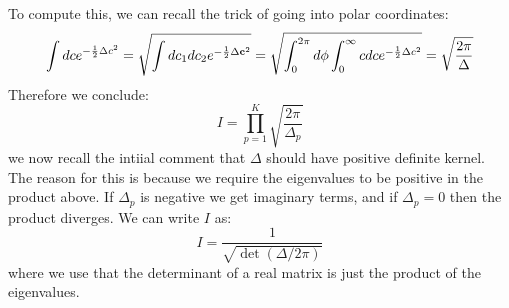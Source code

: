 To compute this, we can recall the trick of going into polar coordinates:
\begin{equation}
    \int dc e^{-\frac{1}{2}\Delta c^2} = \sqrt{\int dc_1dc_2 e^{-\frac{1}{2}\Delta \v{c}^2}} = \sqrt{\int_{0}^{2\pi}d\phi \int_0^\infty cdc e^{-\frac{1}{2}\Delta c^2}} = \sqrt{\frac{2\pi}{\Delta}}
\end{equation}
Therefore we conclude:
\begin{equation}
    I = \prod_{p=1}^K \sqrt{\frac{2\pi}{\Delta_p}}
\end{equation}
we now recall the intiial comment that $\Delta$ should have positive definite kernel. The reason for this is because we require the eigenvalues to be positive in the product above. If $\Delta_p$ is negative we get imaginary terms, and if $\Delta_p = 0$ then the product diverges. We can write $I$ as:
\begin{equation}
    I = \frac{1}{\sqrt{\det(\Delta/2\pi)}}
\end{equation}
where we use that the determinant of a real matrix is just the product of the eigenvalues.

